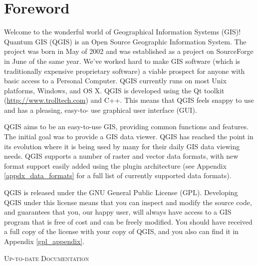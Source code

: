 
\section{Foreword}\label{label_forward}
\setcounter{page}{1}


Welcome to the wonderful world of Geographical Information Systems (GIS)!
Quantum GIS (QGIS) is an Open Source Geographic Information System. The project
was born in May of 2002 and was established as a project on SourceForge in June
of the same year. We've worked hard to make GIS software (which is traditionally
expensive proprietary software) a viable prospect for anyone with basic access
to a Personal Computer. QGIS currently runs on most Unix platforms, Windows, and
OS X. QGIS is developed using the Qt toolkit (\url{http://www.trolltech.com})
and C++. This means that QGIS feels snappy to use and has a pleasing, easy-to-
use graphical user interface (GUI). 

QGIS aims to be an easy-to-use GIS, providing common functions and features.
The initial goal was to provide a GIS data viewer. QGIS has reached the point
in its evolution where it is being used by many for their daily GIS data viewing
needs. QGIS supports a number of raster and vector data formats, with new
format support easily added using the plugin architecture (see Appendix
\ref{appdx_data_formats} for a full list of currently supported data formats).

QGIS is released under the GNU General Public License (GPL). Developing QGIS 
under this license means that you can inspect and modify the source code,
and guarantees that you, our happy user, will always have access to a GIS
program that is free of cost and can be freely modified. You should have
received a full copy of the license with your copy of QGIS, and you also can
find it in Appendix \ref{gpl_appendix}.  

\begin{Tip}\caption{\textsc{Up-to-date Documentation}}
\end{Tip}

